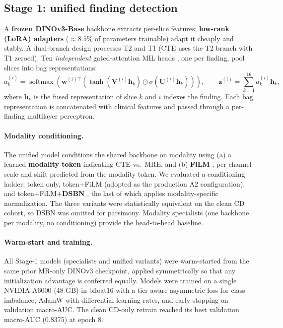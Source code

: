 \documentclass[11pt]{article}
\begin{document}
\subsection*{Stage 1: unified finding detection}

A \textbf{frozen DINOv3-Base} backbone \cite{dinov3} extracts per-slice features; \textbf{low-rank (LoRA)
adapters} \cite{hu2021lora} ($\approx 8.5\%$ of parameters trainable) adapt it cheaply and stably. A
dual-branch design processes T2 and T1 (CTE uses the T2 branch with T1 zeroed). Ten \emph{independent}
gated-attention MIL heads \cite{ilse2018attention}, one per finding, pool slices into bag representations:
\begin{equation}
    a_k^{(i)} = \operatorname{softmax}\!\left( \mathbf{w}^{(i)\top} \!\left( \tanh(\mathbf{V}^{(i)} \mathbf{h}_k) \odot \sigma(\mathbf{U}^{(i)} \mathbf{h}_k) \right) \right), \qquad
    \mathbf{z}^{(i)} = \sum_{k=1}^{16} a_k^{(i)} \mathbf{h}_k ,
\end{equation}
where $\mathbf{h}_k$ is the fused representation of slice $k$ and $i$ indexes the finding. Each bag
representation is concatenated with clinical features and passed through a per-finding multilayer perceptron.

\paragraph{Modality conditioning.}
The unified model conditions the shared backbone on modality using (a) a learned \textbf{modality token}
indicating CTE vs.\ MRE, and (b) \textbf{FiLM} \cite{perez2018film}, per-channel scale and shift predicted
from the modality token. We evaluated a conditioning ladder: token only, token+FiLM (adopted as the
production A2 configuration), and token+FiLM+\textbf{DSBN} \cite{chang2019dsbn}, the last of which applies
modality-specific normalization. The three variants were statistically equivalent on the clean CD cohort, so DSBN was omitted for parsimony.
Modality specialists (one backbone per modality, no conditioning) provide the head-to-head baseline.

\paragraph{Warm-start and training.}
All Stage-1 models (specialists and unified variants) were warm-started from the same prior MR-only DINOv3
checkpoint, applied symmetrically so that any initialization advantage is conferred equally. Models were
trained on a single NVIDIA A6000 (48 GB) in bfloat16 with a tier-aware asymmetric loss \cite{ridnik2021asl}
for class imbalance, AdamW with differential learning rates, and early stopping on validation macro-AUC.
The clean CD-only retrain reached its best validation macro-AUC (0.8375) at epoch 8.
\end{document}
